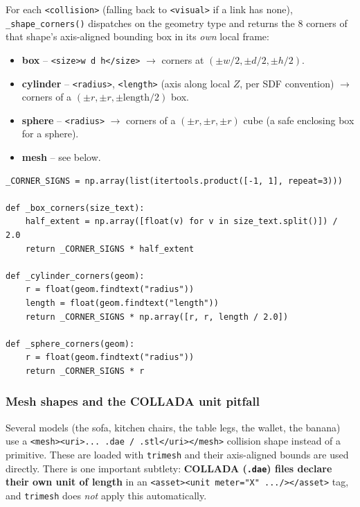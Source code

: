 \documentclass[11pt]{article}
\begin{document}
For each \texttt{<collision>} (falling back to \texttt{<visual>} if a link has
none), \texttt{\_shape\_corners()} dispatches on the geometry type and returns
the 8 corners of that shape's axis-aligned bounding box in its \emph{own}
local frame:

\begin{itemize}
  \item \textbf{box} -- \texttt{<size>w d h</size>} $\to$ corners at $(\pm w/2, \pm d/2, \pm h/2)$.
  \item \textbf{cylinder} -- \texttt{<radius>}, \texttt{<length>} (axis along local $Z$, per SDF convention) $\to$ corners of a $(\pm r, \pm r, \pm \text{length}/2)$ box.
  \item \textbf{sphere} -- \texttt{<radius>} $\to$ corners of a $(\pm r, \pm r, \pm r)$ cube (a safe enclosing box for a sphere).
  \item \textbf{mesh} -- see below.
\end{itemize}

\begin{lstlisting}[caption={\texttt{gazebo\_geometry.py}: primitive corner helpers}]
_CORNER_SIGNS = np.array(list(itertools.product([-1, 1], repeat=3)))

def _box_corners(size_text):
    half_extent = np.array([float(v) for v in size_text.split()]) / 2.0
    return _CORNER_SIGNS * half_extent

def _cylinder_corners(geom):
    r = float(geom.findtext("radius"))
    length = float(geom.findtext("length"))
    return _CORNER_SIGNS * np.array([r, r, length / 2.0])

def _sphere_corners(geom):
    r = float(geom.findtext("radius"))
    return _CORNER_SIGNS * r
\end{lstlisting}

\subsubsection{Mesh shapes and the COLLADA unit pitfall}
\label{sec:colladaunit}

Several models (the sofa, kitchen chairs, the table legs, the wallet, the
banana) use a \texttt{<mesh><uri>...\,.dae\,/\,.stl</uri></mesh>} collision
shape instead of a primitive. These are loaded with \texttt{trimesh} and their
axis-aligned bounds are used directly. There is one important subtlety:
\textbf{COLLADA (\texttt{.dae}) files declare their own unit of length} in an
\texttt{<asset><unit meter="X" .../></asset>} tag, and \texttt{trimesh} does
\emph{not} apply this automatically.
\end{document}
